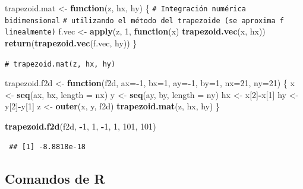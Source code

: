 \documentclass[
  spanish,
  10pt,
]{book}
\newenvironment{Shaded}{\begin{snugshade}}{\end{snugshade}}
\newcommand{\AttributeTok}[1]{\textcolor[rgb]{0.13,0.29,0.53}{#1}}
\newcommand{\CommentTok}[1]{\textcolor[rgb]{0.56,0.35,0.01}{\textit{#1}}}
\newcommand{\ControlFlowTok}[1]{\textcolor[rgb]{0.13,0.29,0.53}{\textbf{#1}}}
\newcommand{\DecValTok}[1]{\textcolor[rgb]{0.00,0.00,0.81}{#1}}
\newcommand{\FunctionTok}[1]{\textcolor[rgb]{0.13,0.29,0.53}{\textbf{#1}}}
\newcommand{\NormalTok}[1]{#1}
\newcommand{\OtherTok}[1]{\textcolor[rgb]{0.56,0.35,0.01}{#1}}
\newcommand{\SpecialCharTok}[1]{\textcolor[rgb]{0.81,0.36,0.00}{\textbf{#1}}}
\theoremstyle{break}
\theoremstyle{nonumberplain}
\renewcommand{\CommentTok}[1]{\textcolor[rgb]{0.41,0.41,0.41}{\texttt{#1}}}
\begin{document}
\begin{Shaded}
\begin{Highlighting}[]
\NormalTok{trapezoid.mat }\OtherTok{\textless{}{-}} \ControlFlowTok{function}\NormalTok{(z, hx, hy) \{ }
\CommentTok{\# Integración numérica bidimensional}
\CommentTok{\# utilizando el método del trapezoide (se aproxima f linealmente)}
\NormalTok{  f.vec }\OtherTok{\textless{}{-}} \FunctionTok{apply}\NormalTok{(z, }\DecValTok{1}\NormalTok{, }\ControlFlowTok{function}\NormalTok{(x) }\FunctionTok{trapezoid.vec}\NormalTok{(x, hx))}
  \FunctionTok{return}\NormalTok{(}\FunctionTok{trapezoid.vec}\NormalTok{(f.vec, hy)) }
\NormalTok{\}}

\CommentTok{\# trapezoid.mat(z, hx, hy) }

\NormalTok{trapezoid.f2d }\OtherTok{\textless{}{-}} \ControlFlowTok{function}\NormalTok{(f2d, }\AttributeTok{ax=}\SpecialCharTok{{-}}\DecValTok{1}\NormalTok{, }\AttributeTok{bx=}\DecValTok{1}\NormalTok{, }\AttributeTok{ay=}\SpecialCharTok{{-}}\DecValTok{1}\NormalTok{, }\AttributeTok{by=}\DecValTok{1}\NormalTok{, }\AttributeTok{nx=}\DecValTok{21}\NormalTok{, }\AttributeTok{ny=}\DecValTok{21}\NormalTok{) \{ }
\NormalTok{  x }\OtherTok{\textless{}{-}} \FunctionTok{seq}\NormalTok{(ax, bx, }\AttributeTok{length =}\NormalTok{ nx)}
\NormalTok{  y }\OtherTok{\textless{}{-}} \FunctionTok{seq}\NormalTok{(ay, by, }\AttributeTok{length =}\NormalTok{ ny)}
\NormalTok{  hx }\OtherTok{\textless{}{-}}\NormalTok{ x[}\DecValTok{2}\NormalTok{]}\SpecialCharTok{{-}}\NormalTok{x[}\DecValTok{1}\NormalTok{]}
\NormalTok{  hy }\OtherTok{\textless{}{-}}\NormalTok{ y[}\DecValTok{2}\NormalTok{]}\SpecialCharTok{{-}}\NormalTok{y[}\DecValTok{1}\NormalTok{]}
\NormalTok{  z }\OtherTok{\textless{}{-}} \FunctionTok{outer}\NormalTok{(x, y, f2d)}
  \FunctionTok{trapezoid.mat}\NormalTok{(z, hx, hy)}
\NormalTok{\}}

\FunctionTok{trapezoid.f2d}\NormalTok{(f2d, }\SpecialCharTok{{-}}\DecValTok{1}\NormalTok{, }\DecValTok{1}\NormalTok{, }\SpecialCharTok{{-}}\DecValTok{1}\NormalTok{, }\DecValTok{1}\NormalTok{, }\DecValTok{101}\NormalTok{, }\DecValTok{101}\NormalTok{) }
\end{Highlighting}
\end{Shaded}

\begin{verbatim}
 ## [1] -8.8818e-18
\end{verbatim}

\subsection{Comandos de R}\label{comandos-de-r-1}
\end{document}
